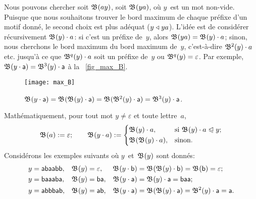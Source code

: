 Nous pouvons chercher soit \(\mathfrak{B}^{}(ay)\), soit \(\mathfrak{B}^{}(ya)\),
où \(y\)~est un mot non-vide. Puisque que nous souhaitons trouver le
bord maximum de chaque préfixe d'un motif donné, le second choix est
plus adéquat (\(y \mathrel{\triangleleft} ya\)). L'idée est de considérer récursivement
\(\mathfrak{B}^{}(y) \cdot a\): si c'est un préfixe de~\(y\), alors
\(\mathfrak{B}^{}(ya) = \mathfrak{B}^{}(y) \cdot a\); sinon, nous cherchons le
bord maximum du bord maximum de~\(y\), c'est-à-dire \(\mathfrak{B}^{2}(y)
\cdot a\) etc. jusqu'à ce que \(\mathfrak{B}^{q}(y) \cdot a\) soit un
préfixe de~\(y\) ou \(\mathfrak{B}^{q}(y) = \varepsilon\). Par exemple,
\(\mathfrak{B}^{}(y \cdot \textsf{a}) = \mathfrak{B}^{3}(y) \cdot \textsf{a}\) à la
\fig~\vref{fig_max_B}.
\begin{figure}[b]
\centering
\texttt{[image: max\_B]}
\caption{\(\mathfrak{B}^{}(y \cdot \textsf{a})
   = \mathfrak{B}^{}(\mathfrak{B}^{}(y) \cdot \textsf{a})
   = \mathfrak{B}^{}(\mathfrak{B}^{2}(y) \cdot \textsf{a})
   = \mathfrak{B}^{3}(y) \cdot \textsf{a}\).
\label{fig_max_B}}
\end{figure}

Mathématiquement, pour tout mot \({y \neq \varepsilon}\) et toute lettre~\(a\),
\begin{equation}
  \mathfrak{B}^{}(a)         := \varepsilon;\qquad
  \mathfrak{B}^{}(y \cdot a) := \left\{
    \begin{aligned}
      & \mathfrak{B}^{}(y) \cdot a,
      && \text{si \(\mathfrak{B}^{}(y) \cdot a \mathrel{\trianglelefteqslant}y\)};\\
      & \mathfrak{B}^{}(\mathfrak{B}^{}(y) \cdot a),
      && \text{sinon.}
    \end{aligned}
  \right.
\label{eq_Border}
\end{equation}
Considérons les exemples suivants où \(y\)~et~\(\mathfrak{B}^{}(y)\) sont donnés:
\begin{align*}
  y             &= \textsf{abaabb},
& \mathfrak{B}^{}(y)  &= \varepsilon,
& \mathfrak{B}^{}(y \cdot \textsf{b})
                &= \mathfrak{B}^{}(\mathfrak{B}^{}(y) \cdot \textsf{b})
                 = \mathfrak{B}^{}(\textsf{b}) = \varepsilon;\\
  y             &= \textsf{baaaba},
& \mathfrak{B}^{}(y)  &= \textsf{ba},
& \mathfrak{B}^{}(y \cdot \textsf{a})
                &= \mathfrak{B}^{}(y) \cdot \textsf{a}
                 = \textsf{baa};\\
  y             &= \textsf{abbbab},
& \mathfrak{B}^{}(y)  &= \textsf{ab},
& \mathfrak{B}^{}(y \cdot \textsf{a})
                &= \mathfrak{B}^{}(\mathfrak{B}^{}(y) \cdot \textsf{a})
                 = \mathfrak{B}^{2}(y) \cdot \textsf{a}
                 = \textsf{a}.
\end{align*}

